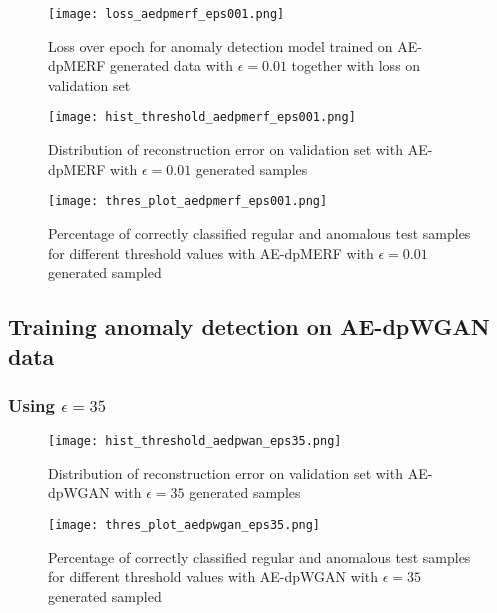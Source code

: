 \begin{figure}[H]
    \centering
    \texttt{[image: loss\_aedpmerf\_eps001.png]}
    \caption{Loss over epoch for anomaly detection model trained on AE-dpMERF generated data with $\epsilon=0.01$ together with loss on validation set}
\end{figure}

\begin{figure}[H]
    \begin{minipage}[b]{\textwidth}
        \centering
        \texttt{[image: hist\_threshold\_aedpmerf\_eps001.png]}
        \caption{Distribution of reconstruction error on validation set with AE-dpMERF with $\epsilon=0.01$ generated samples}
    
    \end{minipage}
    \begin{minipage}[b]{\textwidth}
        \centering
        \texttt{[image: thres\_plot\_aedpmerf\_eps001.png]}
        \caption{Percentage of correctly classified regular and anomalous test samples for different threshold values with AE-dpMERF with $\epsilon=0.01$ generated sampled}
        \label{fig:thres_aegwan}
    \end{minipage}
\end{figure}




\subsection*{Training anomaly detection on AE-dpWGAN data}

\subsubsection*{Using $\epsilon=35$}


\begin{figure}[H]
    \begin{minipage}[b]{\textwidth}
        \centering
        \texttt{[image: hist\_threshold\_aedpwan\_eps35.png]}
        \caption{Distribution of reconstruction error on validation set with AE-dpWGAN with $\epsilon=35$ generated samples}
    
    \end{minipage}
    \begin{minipage}[b]{\textwidth}
        \centering
        \texttt{[image: thres\_plot\_aedpwgan\_eps35.png]}
        \caption{Percentage of correctly classified regular and anomalous test samples for different threshold values with AE-dpWGAN with $\epsilon=35$ generated sampled}
        \label{fig:thres_aegwan}
    \end{minipage}
\end{figure}

